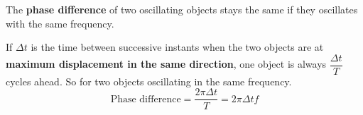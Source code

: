 The \textbf{phase difference} of two oscillating objects stays the same if they oscillates with the same frequency.

If $\Delta t$ is the time between successive instants when the two objects are at \textbf{maximum displacement in the same direction}, one object is always $\dfrac{\Delta t}{T}$ cycles ahead. So for two objects oscillating in the same frequency.
$$\text{Phase difference}=\frac{2\pi\Delta t}{T}=2\pi\Delta tf$$
